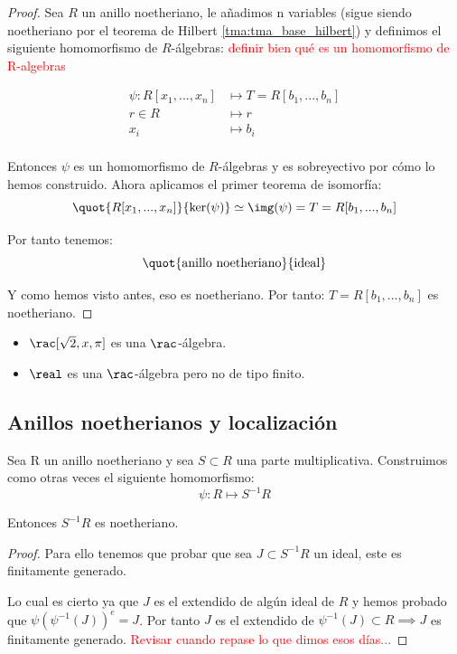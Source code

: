 \begin{proof}
	Sea $R$ un anillo noetheriano, le añadimos n variables (sigue siendo noetheriano por el teorema de Hilbert \ref{tma:tma_base_hilbert}) y definimos el siguiente homomorfismo de $R$-álgebras: \textcolor{red}{definir bien qué es un homomorfismo de R-algebras}
	
	\begin{align*}
		\psi: R[x_1,...,x_n] & \longmapsto  T=R[b_1,...,b_n]\\
		r \in R & \longmapsto r \\
		x_i & \longmapsto b_i \\
	\end{align*}
	
	Entonces $\psi$ es un homomorfismo de $R$-álgebras y es sobreyectivo por cómo lo hemos construido. Ahora aplicamos el primer teorema de isomorfía:
	$$ \quot{R[x_1,...,x_n]}{\ker(\psi)} \simeq \img(\psi)=T=R[b_1,...,b_n]$$
	
	Por tanto tenemos:
	 $$\quot{\text{anillo noetheriano}}{\text{ideal}}$$
	 
	Y como hemos visto antes, eso es noetheriano. Por tanto: $T=R[b_1,...,b_n]$ es noetheriano.
\end{proof}

\begin{example}
	\begin{itemize}
		\item $\rac[\sqrt{2},x, \pi]$ es una $\rac$-álgebra.
		\item $\real$ es una $\rac$-álgebra pero no de tipo finito.
	\end{itemize}
\end{example}

\subsection{Anillos noetherianos y localización}

\begin{prop}
	Sea R un anillo noetheriano y sea $S\subset R$ una parte multiplicativa. Construimos como otras veces el siguiente homomorfismo:
	$$\psi: R \longmapsto S^{-1}R$$
	
	Entonces $S^{-1}R$ es noetheriano.
\end{prop}
\begin{proof}
	Para ello tenemos que probar que sea $J \subset S^{-1}R$ un ideal, este es finitamente generado.
	
	Lo cual es cierto ya que $J$ es el extendido de algún ideal de $R$ y hemos probado que $\psi(\psi^{-1}(J))^e=J$. Por tanto $J$ es el extendido de $\psi^{-1}(J)\subset R \implies J$ es finitamente generado. \textcolor{red}{Revisar cuando repase lo que dimos esos días...} %
\end{proof}



